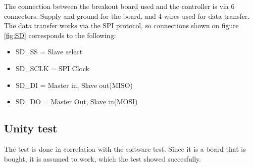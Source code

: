 The connection between the breakout board used and the controller is via 6 connectors. Supply and ground for the board, and 4 wires used for data transfer. The data transfer works via the SPI protocol, so connections shown on figure \vref{fig:SD} corresponds to the following:

\begin{itemize}
	\item{SD\_SS = Slave select}
	\item{SD\_SCLK = SPI Clock}
	\item{SD\_DI = Master in, Slave out(MISO)}
	\item{SD\_DO = Master Out, Slave in(MOSI)}
\end{itemize}

\subsection{Unity test}
The test is done in correlation with the software test. Since it is a board that is bought, it is assumed to work, which the test showed succesfully. 